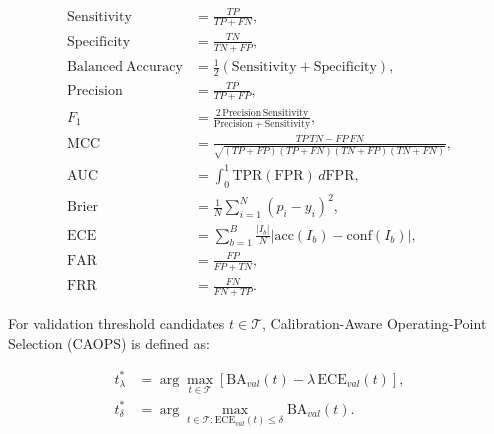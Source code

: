 \begin{align}
\mathrm{Sensitivity} &= \frac{TP}{TP + FN},\\
\mathrm{Specificity} &= \frac{TN}{TN + FP},\\
\mathrm{Balanced\ Accuracy} &= \frac{1}{2}\left(\mathrm{Sensitivity} + \mathrm{Specificity}\right),\\
\mathrm{Precision} &= \frac{TP}{TP + FP},\\
F_1 &= \frac{2\,\mathrm{Precision}\,\mathrm{Sensitivity}}{\mathrm{Precision}+\mathrm{Sensitivity}},\\
\mathrm{MCC} &= \frac{TP\,TN - FP\,FN}{\sqrt{(TP+FP)(TP+FN)(TN+FP)(TN+FN)}},\\
\mathrm{AUC} &= \int_0^1 \mathrm{TPR}(\mathrm{FPR})\,d\mathrm{FPR},\\
\mathrm{Brier} &= \frac{1}{N}\sum_{i=1}^{N}(p_i-y_i)^2,\\
\mathrm{ECE} &= \sum_{b=1}^{B}\frac{|I_b|}{N}\left|\mathrm{acc}(I_b)-\mathrm{conf}(I_b)\right|,\\
\mathrm{FAR} &= \frac{FP}{FP+TN},\\
\mathrm{FRR} &= \frac{FN}{FN+TP}.
\end{align}

For validation threshold candidates $t \in \mathcal{T}$, Calibration-Aware Operating-Point Selection (CAOPS) is defined as:

\begin{align}
t_{\lambda}^{*} &= \arg\max_{t \in \mathcal{T}}\left[\mathrm{BA}_{val}(t) - \lambda\,\mathrm{ECE}_{val}(t)\right],\\
t_{\delta}^{*} &= \arg\max_{t \in \mathcal{T}: \mathrm{ECE}_{val}(t) \leq \delta}\mathrm{BA}_{val}(t).
\end{align}
